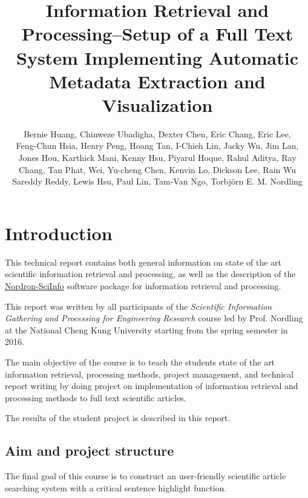 \documentclass[a4paper,twocolumn,twoside]{article}
\begin{document}
 
	
	\title{Information Retrieval and Processing--Setup of a Full Text System Implementing Automatic Metadata Extraction and Visualization}
	\author{Bernie Huang, Chinweze Ubadigha, Dexter Chen, Eric Chang, Eric Lee, \\
		Feng-Chun Hsia, Henry Peng, Hoang Tan, I-Chieh Lin, Jacky Wu, Jim Lan, \\
		Jones Hou, Karthick Mani, Kenny Hsu, Piyarul Hoque, Rahul Aditya, Ray \\
		Chang, Tan Phat, Wei, Yu-cheng Chen, Kenvin Lo, Dickson Lee, Rain Wu\\
		 Sareddy Reddy, Lewis Hsu, Paul Lin, Tam-Van Ngo, Torbj\"{o}rn E. M. Nordling}  %
	\maketitle   
	
	\section{Introduction}
	\label{Introduction}
	
	This technical report contains both general information on state of the art scientific information retrieval and processing, as well as the description of the \href{https://bitbucket.org/nordron/nordron-sciinfo}{Nordron-SciInfo} software package for information retrieval and processing. 
	
	This report was written by all participants of the \emph{Scientific Information Gathering and Processing for Engineering Research} course led by Prof. Nordling at the National Cheng Kung University starting from the spring semester in 2016.
	
	The main objective of the course is to teach the students state of the art information retrieval, processing methods, project management, and technical report writing by doing project on implementation of information retrieval and processing methods to full text scientific articles.
	
	The results of the student project is described in this report.
	
	\subsection{Aim and project structure}
	\label{aim}
	
	The final goal of this course is to construct an user-friendly scientific article searching system with a critical sentence highlight function.
	
\end{document}
